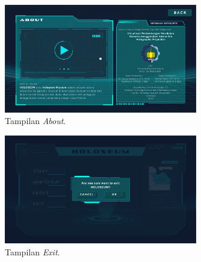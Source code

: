 		\vspace{-2ex}	
		\begin{figure}[H]
			\includegraphics[width=0.75\textwidth]{img/bab3/ui/about.png}
			\caption{Tampilan \textit{About}.}
			\label{fig:sb_about}
		\end{figure}
		\vspace{-2ex}
		\begin{figure}[H]
			\includegraphics[width=0.75\textwidth]{img/bab3/ui/exit.png}
			\caption{Tampilan \textit{Exit}.}
			\label{fig:sb_exit}
		\end{figure}
\vspace{2ex}
	

